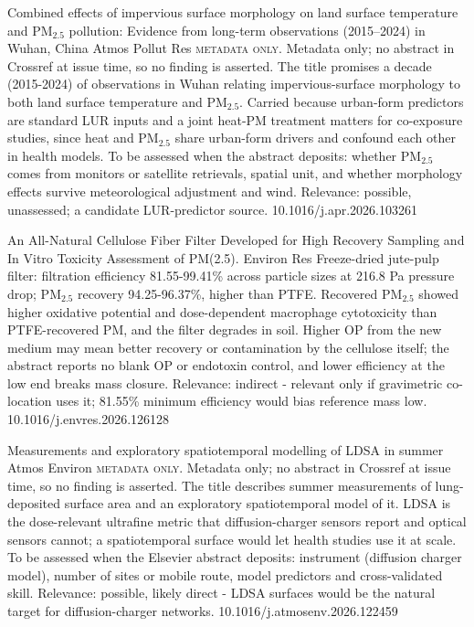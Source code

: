 \documentclass[10pt]{article}
\begin{document}
{Combined effects of impervious surface morphology on land surface temperature and PM$_{2.5}$ pollution: Evidence from long-term observations (2015–2024) in Wuhan, China}
{Atmos Pollut Res}
{\textsc{metadata only.} Metadata only; no abstract in Crossref at issue time, so no finding is asserted. The title promises a decade (2015-2024) of observations in Wuhan relating impervious-surface morphology to both land surface temperature and PM$_{2.5}$. Carried because urban-form predictors are standard LUR inputs and a joint heat-PM treatment matters for co-exposure studies, since heat and PM$_{2.5}$ share urban-form drivers and confound each other in health models. To be assessed when the abstract deposits: whether PM$_{2.5}$ comes from monitors or satellite retrievals, spatial unit, and whether morphology effects survive meteorological adjustment and wind. Relevance: possible, unassessed; a candidate LUR-predictor source.}
{10.1016/j.apr.2026.103261}

\par{}\baselineskip{}\baselineskip
{}

{An All-Natural Cellulose Fiber Filter Developed for High Recovery Sampling and In Vitro Toxicity Assessment of PM(2.5).}
{Environ Res}
{Freeze-dried jute-pulp filter: filtration efficiency 81.55-99.41\% across particle sizes at 216.8 Pa pressure drop; PM$_{2.5}$ recovery 94.25-96.37\%, higher than PTFE. Recovered PM$_{2.5}$ showed higher oxidative potential and dose-dependent macrophage cytotoxicity than PTFE-recovered PM, and the filter degrades in soil. Higher OP from the new medium may mean better recovery or contamination by the cellulose itself; the abstract reports no blank OP or endotoxin control, and lower efficiency at the low end breaks mass closure. Relevance: indirect - relevant only if gravimetric co-location uses it; 81.55\% minimum efficiency would bias reference mass low.}
{10.1016/j.envres.2026.126128}

{Measurements and exploratory spatiotemporal modelling of LDSA in summer}
{Atmos Environ}
{\textsc{metadata only.} Metadata only; no abstract in Crossref at issue time, so no finding is asserted. The title describes summer measurements of lung-deposited surface area and an exploratory spatiotemporal model of it. LDSA is the dose-relevant ultrafine metric that diffusion-charger sensors report and optical sensors cannot; a spatiotemporal surface would let health studies use it at scale. To be assessed when the Elsevier abstract deposits: instrument (diffusion charger model), number of sites or mobile route, model predictors and cross-validated skill. Relevance: possible, likely direct - LDSA surfaces would be the natural target for diffusion-charger networks.}
{10.1016/j.atmosenv.2026.122459}
\end{document}
